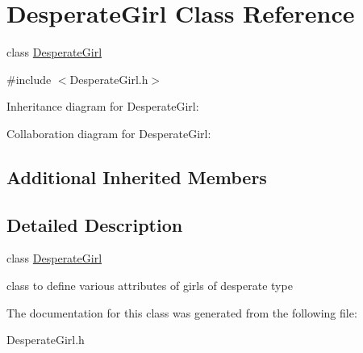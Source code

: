 \hypertarget{classDesperateGirl}{}\section{Desperate\+Girl Class Reference}
\label{classDesperateGirl}


class \hyperlink{classDesperateGirl}{Desperate\+Girl}  




{\ttfamily \#include $<$Desperate\+Girl.\+h$>$}



Inheritance diagram for Desperate\+Girl\+:


Collaboration diagram for Desperate\+Girl\+:
\subsection*{Additional Inherited Members}


\subsection{Detailed Description}
class \hyperlink{classDesperateGirl}{Desperate\+Girl} 

class to define various attributes of girls of desperate type 

The documentation for this class was generated from the following file\+:\begin{DoxyCompactItemize}
\item 
Desperate\+Girl.\+h\end{DoxyCompactItemize}
